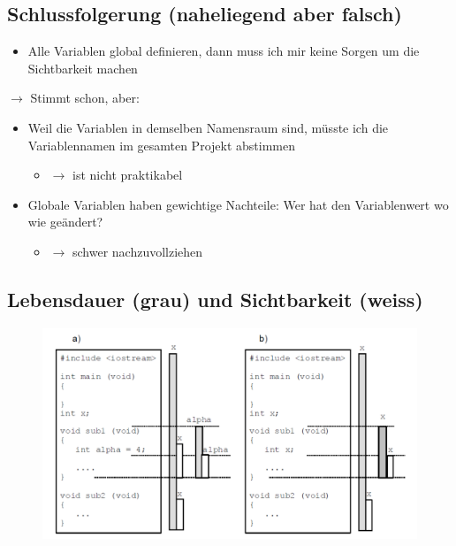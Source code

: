 \subsection{Schlussfolgerung (naheliegend aber falsch)}
\label{sec:Schlussfolgerung (naheliegend aber falsch)}
\begin{itemize}
	\item Alle Variablen global definieren, dann muss ich mir keine Sorgen um die Sichtbarkeit machen
\end{itemize}
$\rightarrow$ Stimmt schon, aber:
\begin{itemize}
	\item Weil die Variablen in demselben Namensraum sind, müsste ich die Variablennamen im gesamten Projekt abstimmen
	\begin{itemize}
		\item[\-] $\rightarrow$ ist nicht praktikabel
	\end{itemize}
	\item Globale Variablen haben gewichtige Nachteile: Wer hat den Variablenwert wo wie geändert?
	\begin{itemize}
		\item[\-] $\rightarrow$ schwer nachzuvollziehen
	\end{itemize}
\end{itemize}

\subsection{Lebensdauer (grau) und Sichtbarkeit (weiss)}
\label{sec:Lebensdauer (grau) und Sichtbarkeit (weiss)}
\noindent
\begin{figure}[hh]
	\centering
	\includegraphics[width=0.7\linewidth]{images/scope1.pdf}
\end{figure}

